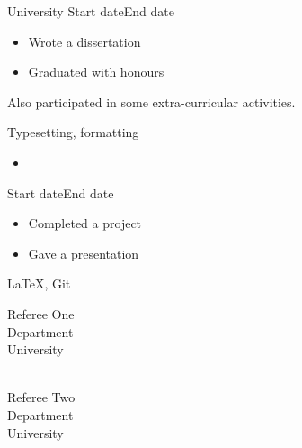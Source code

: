 \documentclass[
  date,
  number,
]{wgu-cv}
\begin{document}
\maketitle





{University}
{Start date}{End date}

\begin{itemize}
    \item Wrote a dissertation
    \item Graduated with honours
\end{itemize}

Also participated in some extra-curricular activities.


Typesetting, formatting



\begin{itemize}
	\item {}
\end{itemize}



{}
{Start date}{End date}

\begin{itemize}
  \item Completed a project
  \item Gave a presentation
\end{itemize}



LaTeX, Git


%
\begin{multicols}{2}
%
\begin{minipage}{\linewidth}
  Referee One \\
  Department \\
  University \\
   \\
\end{minipage}
%
\begin{minipage}{\linewidth}
  Referee Two \\
  Department \\
  University \\
   \\
\end{minipage}
%
\end{multicols}


\nobibliography*
\end{document}
